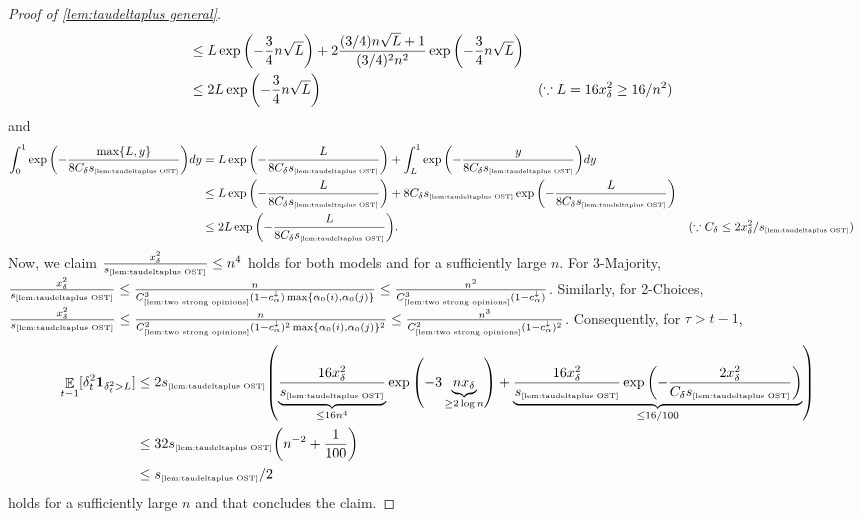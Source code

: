 \documentclass[letterpaper,11pt]{article}
\newcommand{\indicator}{\mathbf{1}}
\DeclareMathOperator*{\E}{\mathbb{E}}
\newcommand{\constref}[1]{C_{\mbox{\tiny\ref{#1}}}}
\newcommand{\varianceref}[1]{\variance_{\mbox{\tiny\ref{#1}}}}
\newcommand{\calphadown}{c^{\downarrow}_\alpha}
\newcommand{\variance}{s}
\newcommand{\xdelta}{x_{\delta}}
\newcommand{\Cdeltavarplus}{C_{\delta}}
\begin{document}
\begin{proof}[Proof of \cref{lem:taudeltaplus general}]
\begin{align*}
    &\leq L\exp\qty(-\frac{3}{4}n\sqrt{L})+2\frac{(3/4)n\sqrt{L}+1}{(3/4)^2n^2}\exp\qty(-\frac{3}{4}n\sqrt{L})\\
    &\leq 2L\exp\qty(-\frac{3}{4}n\sqrt{L}) &&(\because L=16\xdelta^2\geq 16/n^2)
    \end{align*}
    and
    \begin{align*}
        \int_0^1\exp\qty(-\frac{\max\{L,y\}}{8\Cdeltavarplus\varianceref{lem:taudeltaplus OST}})dy
        &=L\exp\qty(-\frac{L}{8\Cdeltavarplus\varianceref{lem:taudeltaplus OST}})+\int_L^1\exp\qty(-\frac{y}{8\Cdeltavarplus\varianceref{lem:taudeltaplus OST}})dy\\
        &\leq L\exp\qty(-\frac{L}{8\Cdeltavarplus\varianceref{lem:taudeltaplus OST}})+8\Cdeltavarplus\varianceref{lem:taudeltaplus OST}\exp\qty(-\frac{L}{8\Cdeltavarplus\varianceref{lem:taudeltaplus OST}})\\
        &\leq 2L\exp\qty(-\frac{L}{8\Cdeltavarplus\varianceref{lem:taudeltaplus OST}}). &&(\because \Cdeltavarplus\leq 2\xdelta^2/\varianceref{lem:taudeltaplus OST})
    \end{align*}
    Now, we claim $\frac{\xdelta^2}{\varianceref{lem:taudeltaplus OST}}\leq n^4$ holds for both models and for a sufficiently large $n$.
    For 3-Majority, $\frac{\xdelta^2}{\varianceref{lem:taudeltaplus OST}}\leq \frac{n}{\constref{lem:two strong opinions}^3(1-\calphadown)\max\{\alpha_0(i),\alpha_0(j)\}}\leq \frac{n^2}{\constref{lem:two strong opinions}^3(1-\calphadown)}$.
    Similarly, for 2-Choices,
    $\frac{\xdelta^2}{\varianceref{lem:taudeltaplus OST}}\leq \frac{n}{\constref{lem:two strong opinions}^2(1-\calphadown)^2\max\{\alpha_0(i),\alpha_0(j)\}^2}\leq \frac{n^3}{\constref{lem:two strong opinions}^2(1-\calphadown)^2}$.
    Consequently, for $\tau>t-1$, 
    \begin{align*}
        \E_{t-1}[\delta_{t}^2\indicator_{\delta_t^2> L}]
        &\leq 2\varianceref{lem:taudeltaplus OST}\qty(\underbrace{\frac{16\xdelta^2}{\varianceref{lem:taudeltaplus OST}}}_{\leq 16n^{4}}\exp\qty(-3\underbrace{n\xdelta}_{\geq 2 \log n})
        +\underbrace{\frac{16\xdelta^2}{\varianceref{lem:taudeltaplus OST}}\exp\qty(-\frac{2\xdelta^2}{\Cdeltavarplus\varianceref{lem:taudeltaplus OST}})}_{\leq 16/100})\\
        &\leq 32\varianceref{lem:taudeltaplus OST}\qty(n^{-2}+\frac{1}{100}) \\
        &\leq \varianceref{lem:taudeltaplus OST}/2
    \end{align*}
    holds for a sufficiently large $n$ and that concludes the claim.
\end{proof}
\end{document}
